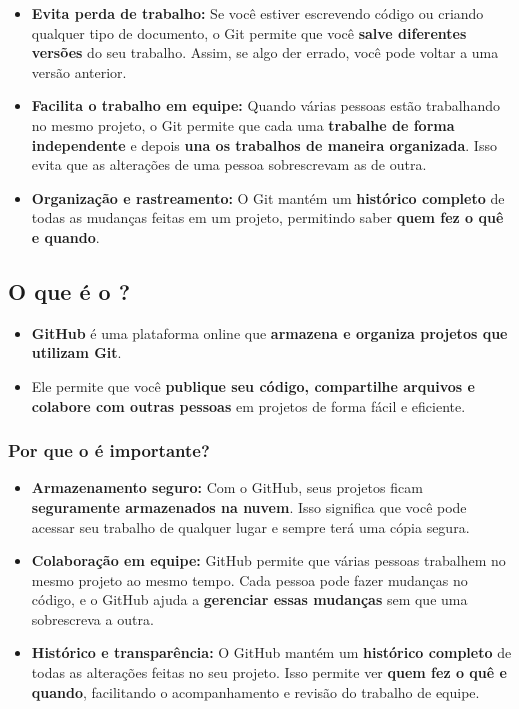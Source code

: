 \documentclass[
  letterpaper,
  DIV=11,
  numbers=noendperiod]{scrartcl}
\begin{document}
\begin{itemize}
\item
  \textbf{Evita perda de trabalho:} Se você estiver escrevendo código ou
  criando qualquer tipo de documento, o Git permite que você
  \textbf{salve diferentes versões} do seu trabalho. Assim, se algo der
  errado, você pode voltar a uma versão anterior.
\item
  \textbf{Facilita o trabalho em equipe:} Quando várias pessoas estão
  trabalhando no mesmo projeto, o Git permite que cada uma
  \textbf{trabalhe de forma independente} e depois \textbf{una os
  trabalhos de maneira organizada}. Isso evita que as alterações de uma
  pessoa sobrescrevam as de outra.
\item
  \textbf{Organização e rastreamento:} O Git mantém um \textbf{histórico
  completo} de todas as mudanças feitas em um projeto, permitindo saber
  \textbf{quem fez o quê e quando}.
\end{itemize}

\subsection{O que é o ?}\label{o-que-uxe9-o-1}

\begin{itemize}
\item
  \textbf{GitHub} é uma plataforma online que \textbf{armazena e
  organiza projetos que utilizam Git}.
\item
  Ele permite que você \textbf{publique seu código, compartilhe arquivos
  e colabore com outras pessoas} em projetos de forma fácil e eficiente.
\end{itemize}

\subsubsection{\texorpdfstring{Por que o é
importante?}{Por que o  é importante?}}\label{por-que-o-uxe9-importante-1}

\begin{itemize}
\item
  \textbf{Armazenamento seguro:} Com o GitHub, seus projetos ficam
  \textbf{seguramente armazenados na nuvem}. Isso significa que você
  pode acessar seu trabalho de qualquer lugar e sempre terá uma cópia
  segura.
\item
  \textbf{Colaboração em equipe:} GitHub permite que várias pessoas
  trabalhem no mesmo projeto ao mesmo tempo. Cada pessoa pode fazer
  mudanças no código, e o GitHub ajuda a \textbf{gerenciar essas
  mudanças} sem que uma sobrescreva a outra.
\item
  \textbf{Histórico e transparência:} O GitHub mantém um
  \textbf{histórico completo} de todas as alterações feitas no seu
  projeto. Isso permite ver \textbf{quem fez o quê e quando},
  facilitando o acompanhamento e revisão do trabalho de equipe.
\end{itemize}
\end{document}
